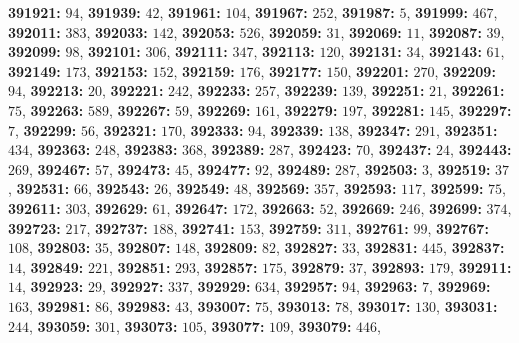 \textsf{\bfseries 391921:} $94$, \textsf{\bfseries 391939:} $42$, \textsf{\bfseries 391961:} $104$, \textsf{\bfseries 391967:} $252$, \textsf{\bfseries 391987:} $5$, \textsf{\bfseries 391999:} $467$, \textsf{\bfseries 392011:} $383$, \textsf{\bfseries 392033:} $142$, \textsf{\bfseries 392053:} $526$, \textsf{\bfseries 392059:} $31$, \textsf{\bfseries 392069:} $11$, \textsf{\bfseries 392087:} $39$, \textsf{\bfseries 392099:} $98$, \textsf{\bfseries 392101:} $306$, \textsf{\bfseries 392111:} $347$, \textsf{\bfseries 392113:} $120$, \textsf{\bfseries 392131:} $34$, \textsf{\bfseries 392143:} $61$, \textsf{\bfseries 392149:} $173$, \textsf{\bfseries 392153:} $152$, \textsf{\bfseries 392159:} $176$, \textsf{\bfseries 392177:} $150$, \textsf{\bfseries 392201:} $270$, \textsf{\bfseries 392209:} $94$, \textsf{\bfseries 392213:} $20$, \textsf{\bfseries 392221:} $242$, \textsf{\bfseries 392233:} $257$, \textsf{\bfseries 392239:} $139$, \textsf{\bfseries 392251:} $21$, \textsf{\bfseries 392261:} $75$, \textsf{\bfseries 392263:} $589$, \textsf{\bfseries 392267:} $59$, \textsf{\bfseries 392269:} $161$, \textsf{\bfseries 392279:} $197$, \textsf{\bfseries 392281:} $145$, \textsf{\bfseries 392297:} $7$, \textsf{\bfseries 392299:} $56$, \textsf{\bfseries 392321:} $170$, \textsf{\bfseries 392333:} $94$, \textsf{\bfseries 392339:} $138$, \textsf{\bfseries 392347:} $291$, \textsf{\bfseries 392351:} $434$, \textsf{\bfseries 392363:} $248$, \textsf{\bfseries 392383:} $368$, \textsf{\bfseries 392389:} $287$, \textsf{\bfseries 392423:} $70$, \textsf{\bfseries 392437:} $24$, \textsf{\bfseries 392443:} $269$, \textsf{\bfseries 392467:} $57$, \textsf{\bfseries 392473:} $45$, \textsf{\bfseries 392477:} $92$, \textsf{\bfseries 392489:} $287$, \textsf{\bfseries 392503:} $3$, \textsf{\bfseries 392519:} $37$, \textsf{\bfseries 392531:} $66$, \textsf{\bfseries 392543:} $26$, \textsf{\bfseries 392549:} $48$, \textsf{\bfseries 392569:} $357$, \textsf{\bfseries 392593:} $117$, \textsf{\bfseries 392599:} $75$, \textsf{\bfseries 392611:} $303$, \textsf{\bfseries 392629:} $61$, \textsf{\bfseries 392647:} $172$, \textsf{\bfseries 392663:} $52$, \textsf{\bfseries 392669:} $246$, \textsf{\bfseries 392699:} $374$, \textsf{\bfseries 392723:} $217$, \textsf{\bfseries 392737:} $188$, \textsf{\bfseries 392741:} $153$, \textsf{\bfseries 392759:} $311$, \textsf{\bfseries 392761:} $99$, \textsf{\bfseries 392767:} $108$, \textsf{\bfseries 392803:} $35$, \textsf{\bfseries 392807:} $148$, \textsf{\bfseries 392809:} $82$, \textsf{\bfseries 392827:} $33$, \textsf{\bfseries 392831:} $445$, \textsf{\bfseries 392837:} $14$, \textsf{\bfseries 392849:} $221$, \textsf{\bfseries 392851:} $293$, \textsf{\bfseries 392857:} $175$, \textsf{\bfseries 392879:} $37$, \textsf{\bfseries 392893:} $179$, \textsf{\bfseries 392911:} $14$, \textsf{\bfseries 392923:} $29$, \textsf{\bfseries 392927:} $337$, \textsf{\bfseries 392929:} $634$, \textsf{\bfseries 392957:} $94$, \textsf{\bfseries 392963:} $7$, \textsf{\bfseries 392969:} $163$, \textsf{\bfseries 392981:} $86$, \textsf{\bfseries 392983:} $43$, \textsf{\bfseries 393007:} $75$, \textsf{\bfseries 393013:} $78$, \textsf{\bfseries 393017:} $130$, \textsf{\bfseries 393031:} $244$, \textsf{\bfseries 393059:} $301$, \textsf{\bfseries 393073:} $105$, \textsf{\bfseries 393077:} $109$, \textsf{\bfseries 393079:} $446$, 
